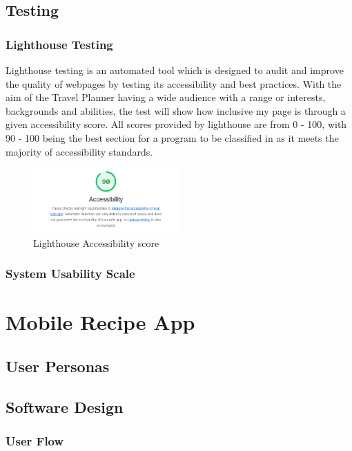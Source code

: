 \documentclass[]{project_final}
\begin{document}
\subsection{Testing}
\subsubsection{Lighthouse Testing}
Lighthouse testing is an automated tool which is designed to audit and improve the quality of webpages by testing its accessibility and best practices. With the aim of the Travel Planner having a wide audience with a range or interests, backgrounds and abilities, the test will show how inclusive my page is through a given accessibility score.
All scores provided by lighthouse are from 0 - 100, with 90 - 100 being the best section for a program to be classified in as it meets the majority of accessibility standards.

\begin{figure}[ht!]
  \centering
  \includegraphics[width=0.5\textwidth]{lighthouse.png}
  \vspace*{0.0cm}
  \caption{Lighthouse Accessibility score}
  \label{fig:1}
\end{figure}

\subsubsection{System Usability Scale}


\section{Mobile Recipe App}
\subsection{User Personas}
\subsection{Software Design}
\subsubsection{User Flow}
\end{document}
